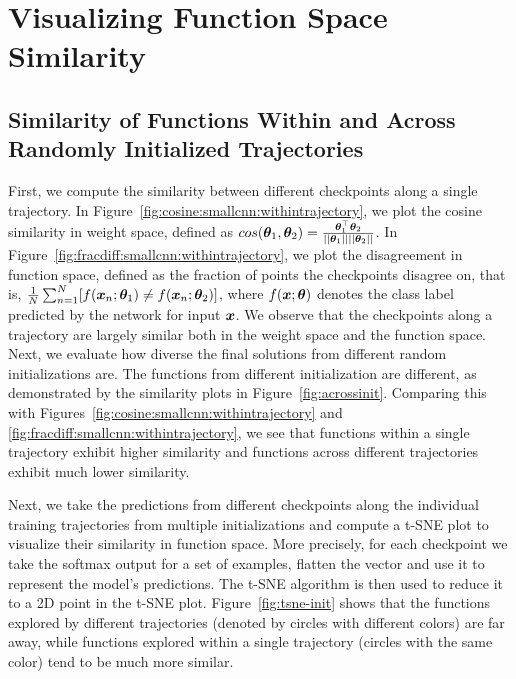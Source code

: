 \documentclass{article}
\begin{document}
%
%
%
%
%
%
%
%
%
%
%
%
%
%
%
%
%
%
%
%
%
%
%
%


 \section{Visualizing Function Space Similarity} 
\subsection{Similarity of Functions Within and Across Randomly Initialized Trajectories}
%

%
%

First, we compute the similarity between different checkpoints along a single trajectory. In Figure~\ref{fig:cosine:smallcnn:withintrajectory}, we plot the cosine similarity in weight space, defined as $cos({\bm{\theta}}_1,{\bm{\theta}}_2)=\frac{{\bm{\theta}}_1^\top{\bm{\theta}}_2}{||{\bm{\theta}}_1||||{\bm{\theta}}_2||}$.  
In Figure~\ref{fig:fracdiff:smallcnn:withintrajectory}, we plot the disagreement in function space, defined as the fraction of points the checkpoints disagree on, that is, $\frac{1}{N}\sum_{n=1}^N [f({\bm{x}}_n;{\bm{\theta}}_1)\neq f({\bm{x}}_n;{\bm{\theta}}_2)]$, where $f({\bm{x}};{\bm{\theta}})$ denotes the class label predicted by the network for input ${\bm{x}}$. 
We observe that the checkpoints along a trajectory are largely similar both in the weight space and the function space.
%
Next, we evaluate how diverse the final solutions from different random initializations are. 
%
%
The functions from different initialization are different,  as demonstrated by the similarity plots in 
Figure~\ref{fig:acrossinit}. Comparing this with Figures~\ref{fig:cosine:smallcnn:withintrajectory} and \ref{fig:fracdiff:smallcnn:withintrajectory}, we see that functions within a single trajectory exhibit higher similarity  and functions across  different trajectories exhibit much lower similarity. %

Next, we take the predictions from different checkpoints along the individual training trajectories from multiple initializations and compute a t-SNE plot \citep{maaten2008visualizing} to visualize their similarity in function space. More precisely, for each checkpoint we take the softmax output for a set of examples, flatten the vector and use it to represent the model's predictions. The t-SNE algorithm is then used to reduce it to a 2D point in the t-SNE plot. 
Figure~\ref{fig:tsne-init} shows that the functions explored by different trajectories (denoted by circles with different colors) are far away, while functions explored within a single trajectory (circles with the same color) tend to be much more similar. 
\end{document}
